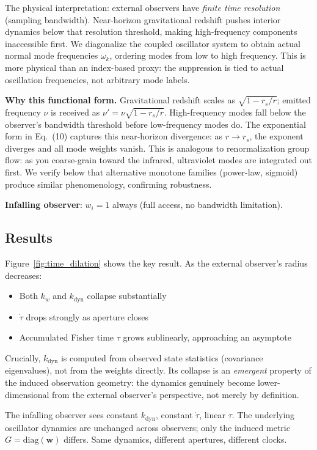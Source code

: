 \documentclass[11pt,a4paper]{article}
\begin{document}
The physical interpretation: external observers have \emph{finite time resolution} (sampling bandwidth). Near-horizon gravitational redshift pushes interior dynamics below that resolution threshold, making high-frequency components inaccessible first. We diagonalize the coupled oscillator system to obtain actual normal mode frequencies $\omega_k$, ordering modes from low to high frequency. This is more physical than an index-based proxy: the suppression is tied to actual oscillation frequencies, not arbitrary mode labels.

\textbf{Why this functional form.} Gravitational redshift scales as $\sqrt{1 - r_s/r}$; emitted frequency $\nu$ is received as $\nu' = \nu \sqrt{1 - r_s/r}$. High-frequency modes fall below the observer's bandwidth threshold before low-frequency modes do. The exponential form in Eq.~(10) captures this near-horizon divergence: as $r \to r_s$, the exponent diverges and all mode weights vanish. This is analogous to renormalization group flow: as you coarse-grain toward the infrared, ultraviolet modes are integrated out first. We verify below that alternative monotone families (power-law, sigmoid) produce similar phenomenology, confirming robustness.

\textbf{Infalling observer}: $w_i = 1$ always (full access, no bandwidth limitation).

\subsection{Results}

Figure~\ref{fig:time_dilation} shows the key result. As the external observer's radius decreases:
\begin{itemize}
    \item Both $k_w$ and $k_{\mathrm{dyn}}$ collapse substantially
    \item $\dot{\tau}$ drops strongly as aperture closes
    \item Accumulated Fisher time $\tau$ grows sublinearly, approaching an asymptote
\end{itemize}

Crucially, $k_{\mathrm{dyn}}$ is computed from observed state statistics (covariance eigenvalues), not from the weights directly. Its collapse is an \emph{emergent} property of the induced observation geometry: the dynamics genuinely become lower-dimensional from the external observer's perspective, not merely by definition.

The infalling observer sees constant $k_{\mathrm{dyn}}$, constant $\dot{\tau}$, linear $\tau$. The underlying oscillator dynamics are unchanged across observers; only the induced metric $G = \mathrm{diag}(\mathbf{w})$ differs. Same dynamics, different apertures, different clocks.
\end{document}
